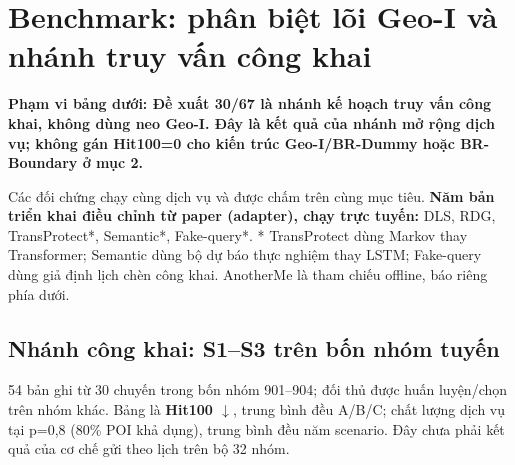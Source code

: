 \documentclass[10pt,a4paper]{article}
\newcommand{\key}[1]{\par\smallskip\noindent\colorbox{pale}{\parbox{\dimexpr\linewidth-2\fboxsep}{\textbf{#1}}}\par\smallskip}
\begin{document}
\clearpage
\section{Benchmark: phân biệt lõi Geo-I và nhánh truy vấn công khai}\label{sec:3}
\key{Phạm vi bảng dưới: Đề xuất 30/67 là nhánh kế hoạch truy vấn công khai, không dùng neo Geo-I. Đây là kết quả của nhánh mở rộng dịch vụ; không gán Hit100=0 cho kiến trúc Geo-I/BR-Dummy hoặc BR-Boundary ở mục 2.}

Các đối chứng chạy cùng dịch vụ và được chấm trên cùng mục tiêu. \textbf{Năm bản triển khai điều chỉnh từ paper (adapter), chạy trực tuyến:} DLS, RDG, TransProtect*, Semantic*, Fake-query*. * TransProtect dùng Markov thay Transformer; Semantic dùng bộ dự báo thực nghiệm thay LSTM; Fake-query dùng giả định lịch chèn công khai. AnotherMe là tham chiếu offline, báo riêng phía dưới.

\subsection{Nhánh công khai: S1–S3 trên bốn nhóm tuyến}\label{sub:3.1}
54 bản ghi từ 30 chuyến trong bốn nhóm 901–904; đối thủ được huấn luyện/chọn trên nhóm khác. Bảng là \textbf{Hit100 $\downarrow$}, trung bình đều A/B/C; chất lượng dịch vụ tại p=0,8 (80\% POI khả dụng), trung bình đều năm scenario. Đây chưa phải kết quả của cơ chế gửi theo lịch trên bộ 32 nhóm.
\end{document}
